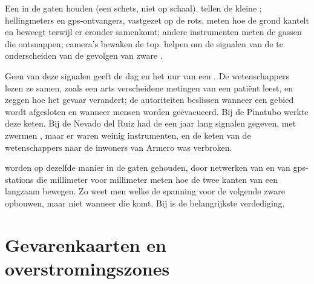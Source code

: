 \begin{omfigure}
{\small Een  in de gaten houden (een schets, niet op schaal).
 tellen de kleine ; hellingmeters en
gps-ontvangers, vastgezet op de rots, meten hoe de grond kantelt en
beweegt terwijl er eronder  samenkomt; andere instrumenten meten de
gassen die ontsnappen; camera's bewaken de top.  helpen om de
signalen van de  te onderscheiden van de gevolgen van zware .}
\label{fig:g9:natural-risks:monitoring}
\end{omfigure}

Geen van deze signalen geeft de dag en het uur van een . De
wetenschappers lezen ze samen, zoals een arts verscheidene metingen van
een patiënt leest, en zeggen hoe het gevaar verandert; de autoriteiten
beslissen wanneer een gebied wordt afgesloten en wanneer mensen worden
geëvacueerd. Bij de Pinatubo werkte deze keten. Bij de Nevado del Ruiz had
de  een jaar lang signalen gegeven, met zwermen , maar
er waren weinig instrumenten, en de keten van de wetenschappers naar de
inwoners van Armero was verbroken.

 worden op dezelfde manier in de gaten gehouden, door netwerken van
 en van gps-stations die millimeter voor millimeter meten hoe
de twee kanten van een  langzaam bewegen. Zo weet men welke 
de spanning voor de volgende zware  opbouwen, maar niet wanneer
die komt. Bij  is  de belangrijkste verdediging.

\section{Gevarenkaarten en overstromingszones}


